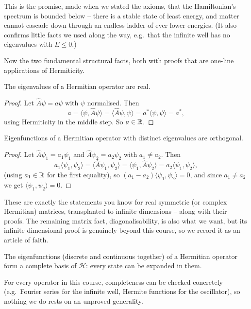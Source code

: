 \documentclass[a4paper]{scrartcl}
\newcommand{\inp}[2]{\langle #1, #2 \rangle}
\begin{document}
This is the promise, made when we stated the axioms, that the Hamiltonian's spectrum is bounded below -- there is a stable state of least energy, and matter cannot cascade down through an endless ladder of ever-lower energies. (It also confirms little facts we used along the way, e.g.\ that the infinite well has no eigenvalues with $E \leq 0$.)

Now the two fundamental structural facts, both with proofs that are one-line applications of Hermiticity.

\begin{proposition}
    The eigenvalues of a Hermitian operator are real.
\end{proposition}
\begin{proof}
    Let $\hat{A} \psi = a \psi$ with $\psi$ normalised. Then
    $$
    a = \inp{\psi}{\hat{A} \psi} = \inp{\hat{A}\psi}{\psi} = a^* \inp{\psi}{\psi} = a^*,
    $$
    using Hermiticity in the middle step. So $a \in \mathbb{R}$.
\end{proof}

\begin{proposition}
    Eigenfunctions of a Hermitian operator with distinct eigenvalues are orthogonal.
\end{proposition}
\begin{proof}
    Let $\hat{A}\psi_1 = a_1 \psi_1$ and $\hat{A} \psi_2 = a_2 \psi_2$ with $a_1 \neq a_2$. Then
    $$
    a_1 \inp{\psi_1}{\psi_2} = \inp{\hat A \psi_1}{\psi_2} = \inp{\psi_1}{\hat{A} \psi_2} = a_2 \inp{\psi_1}{\psi_2},
    $$
    (using $a_1 \in \mathbb{R}$ for the first equality), so $(a_1 - a_2)\inp{\psi_1}{\psi_2} = 0$, and since $a_1 \neq a_2$ we get $\inp{\psi_1}{\psi_2} = 0$.
\end{proof}

These are exactly the statements you know for real symmetric (or complex Hermitian) matrices, transplanted to infinite dimensions -- along with their proofs. The remaining matrix fact, diagonalisability, is also what we want, but its infinite-dimensional proof is genuinely beyond this course, so we record it as an article of faith.

\begin{fact}
    The eigenfunctions (discrete and continuous together) of a Hermitian operator form a complete basis of $\mathcal{H}$: every state can be expanded in them.
\end{fact}

For every operator in this course, completeness can be checked concretely (e.g.\ Fourier series for the infinite well, Hermite functions for the oscillator), so nothing we do rests on an unproved generality.
\end{document}
